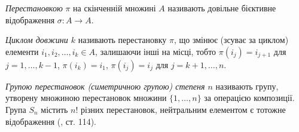 \begin{definition}
    \emph{Перестановкою} $\pi$ на скінченній множині $A$
    називають довільне бієктивне відображення $\sigma: A \to A$.
\end{definition}
\begin{definition}
    \emph{Циклом довжини $k$} називають перестановку $\pi$, що змінює
    (зсуває за циклом) елементи $i_1, i_2, \dots, i_k \in A$, залишаючи
    інші на місці, тобто $\pi(i_{j}) = i_{j+1}$ для $j=1,\dots,k-1$,
    $\pi(i_k) = i_1$, $\pi(i_j) = i_j$ для $j = k+1, \dots, n$. 
\end{definition}
\begin{definition}
    \emph{Групою перестановок (симетричною групою) степеня $n$}
    називають групу, утворену множиною перестановок
    множини $\{1, \dots, n\}$ за операцією композиції.
    Група $S_n$ містить $n!$ різних перестановок, нейтральним елементом є
    тотожне відображення (\cite{Spectorsky}, ст. 114).
\end{definition}